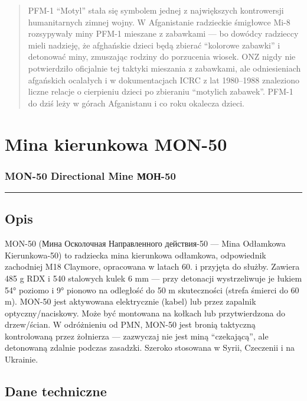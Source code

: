 \documentclass[12pt,openany,oneside]{book}
\begin{document}
\begin{quote}
PFM-1 ``Motyl'' stała się symbolem jednej z największych kontrowersji
humanitarnych zimnej wojny. W Afganistanie radzieckie śmigłowce Mi-8
rozsypywały miny PFM-1 mieszane z zabawkami --- bo dowódcy radzieccy
mieli nadzieję, że afghańskie dzieci będą zbierać ``kolorowe zabawki'' i
detonować miny, zmuszając rodziny do porzucenia wiosek. ONZ nigdy nie
potwierdziło oficjalnie tej taktyki mieszania z zabawkami, ale
odniesieniach afgańskich ocalałych i w dokumentacjach ICRC z lat
1980--1988 znaleziono liczne relacje o cierpieniu dzieci po zbieraniu
``motylich zabawek''. PFM-1 do dziś leży w górach Afganistanu i co roku
okalecza dzieci.
\end{quote}

\chapter{Mina kierunkowa MON-50}\label{mina-kierunkowa-mon-50}

\subsection{MON-50 Directional Mine \textbar{}
МОН-50}\label{mon-50-directional-mine-ux43cux43eux43d-50}

\begin{center}\rule{0.5\linewidth}{0.5pt}\end{center}

\section{Opis}\label{opis-112}

MON-50 (Мина Осколочная Направленного действия-50 --- Mina Odłamkowa
Kierunkowa-50) to radziecka mina kierunkowa odłamkowa, odpowiednik
zachodniej M18 Claymore, opracowana w latach 60. i przyjęta do służby.
Zawiera 485 g RDX i 540 stalowych kulek 6 mm --- przy detonacji
wystrzeliwuje je łukiem 54° poziomo i 9° pionowo na odległość do 50 m
skuteczności (strefa śmierci do 60 m). MON-50 jest aktywowana
elektrycznie (kabel) lub przez zapalnik optyczny/naciskowy. Może być
montowana na kołkach lub przytwierdzona do drzew/ścian. W odróżnieniu od
PMN, MON-50 jest bronią taktyczną kontrolowaną przez żołnierza ---
zazwyczaj nie jest miną ``czekającą'', ale detonowaną zdalnie podczas
zasadzki. Szeroko stosowana w Syrii, Czeczenii i na Ukrainie.

\section{Dane techniczne}\label{dane-techniczne-112}
\end{document}
